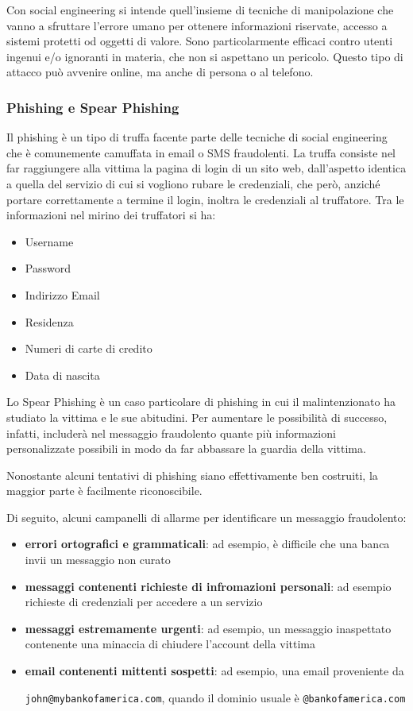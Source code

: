 Con social engineering si intende quell'insieme di tecniche di manipolazione che vanno a sfruttare l'errore umano per ottenere informazioni riservate, accesso a sistemi protetti od oggetti di valore. Sono particolarmente efficaci contro utenti ingenui e/o ignoranti in materia, che non si aspettano un pericolo. Questo tipo di attacco può avvenire online, ma anche di persona o al telefono.

\subsubsection{Phishing e Spear Phishing}

Il phishing è un tipo di truffa facente parte delle tecniche di social engineering che è comunemente camuffata in email o SMS fraudolenti. La truffa consiste nel far raggiungere alla vittima la pagina di login di un sito web, dall'aspetto identica a quella del servizio di cui si vogliono rubare le credenziali, che però, anziché portare correttamente a termine il login, inoltra le credenziali al truffatore.
Tra le informazioni nel mirino dei truffatori si ha:
\begin{itemize}
    \item Username
    \item Password
    \item Indirizzo Email
    \item Residenza
    \item Numeri di carte di credito
    \item Data di nascita
\end{itemize}

Lo Spear Phishing è un caso particolare di phishing in cui il malintenzionato ha studiato la vittima e le sue abitudini. Per aumentare le possibilità di successo, infatti, includerà nel messaggio fraudolento quante più informazioni personalizzate possibili in modo da far abbassare la guardia della vittima.

Nonostante alcuni tentativi di phishing siano effettivamente ben costruiti, la maggior parte è facilmente riconoscibile.

Di seguito, alcuni campanelli di allarme per identificare un messaggio fraudolento:

\begin{itemize}
    \item \textbf{errori ortografici e grammaticali}: ad esempio, è difficile che una banca invii un messaggio non curato
    \item \textbf{messaggi contenenti richieste di infromazioni personali}: ad esempio richieste di credenziali per accedere a un servizio
    \item \textbf{messaggi estremamente urgenti}: ad esempio, un messaggio inaspettato contenente una minaccia di chiudere l'account della vittima
    \item \textbf{email contenenti mittenti sospetti}: ad esempio, una email proveniente da

          \texttt{john@mybankofamerica.com}, quando il dominio usuale è \texttt{@bankofamerica.com}
\end{itemize}

